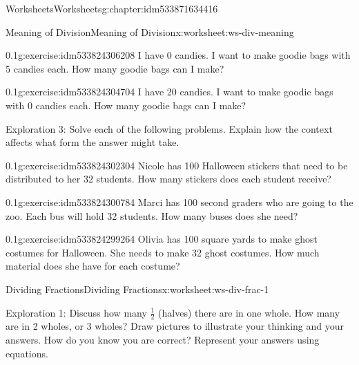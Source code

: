 \documentclass[twoside,11pt,]{book}
\begin{document}
\begin{chapterptx}{Worksheets}{}{Worksheets}{}{}{g:chapter:idm533871634416}
\begin{worksheet-section-numberless}{Meaning of Division}{}{Meaning of Division}{}{}{x:worksheet:ws-div-meaning}
\begin{introduction}{}
\end{introduction}%
\begin{divisionexercise}{5}{}{0.1}{g:exercise:idm533824306208}%
I have 0 candies.  I want to make goodie bags with 5 candies each.  How many goodie bags can I make?%
\end{divisionexercise}%
\begin{divisionexercise}{6}{}{0.1}{g:exercise:idm533824304704}%
I have 20 candies.  I want to make goodie bags with 0 candies each.  How many goodie bags can I make?%
\end{divisionexercise}%
\begin{introduction}{}%
Exploration 3: Solve each of the following problems. Explain how the context affects what form the answer might take.%
\end{introduction}%
\begin{divisionexercise}{7}{}{0.1}{g:exercise:idm533824302304}%
Nicole has 100 Halloween stickers that need to be distributed to her 32 students. How many stickers does each student receive?%
\end{divisionexercise}%
\begin{divisionexercise}{8}{}{0.1}{g:exercise:idm533824300784}%
Marci has 100 second graders who are going to the zoo. Each bus will hold 32 students. How many buses does she need?%
\end{divisionexercise}%
\begin{divisionexercise}{9}{}{0.1}{g:exercise:idm533824299264}%
Olivia has 100 square yards to make ghost costumes for Halloween. She needs to make 32 ghost costumes. How much material does she have for each costume?%
\end{divisionexercise}%
\end{worksheet-section-numberless}
\restoregeometry
%
%
\typeout{************************************************}
\typeout{************************************************}
%
\begin{worksheet-section-numberless}{Dividing Fractions}{}{Dividing Fractions}{}{}{x:worksheet:ws-div-frac-1}
\begin{introduction}{}%
Exploration 1: Discuss how many \(\frac{1}{2} \) (halves) there are in one whole. How many are in 2 wholes, or 3 wholes? Draw pictures to illustrate your thinking and your answers. How do you know you are correct? Represent your answers using equations.%
\end{introduction}%

\end{worksheet-section-numberless}
\end{chapterptx}
\end{document}
